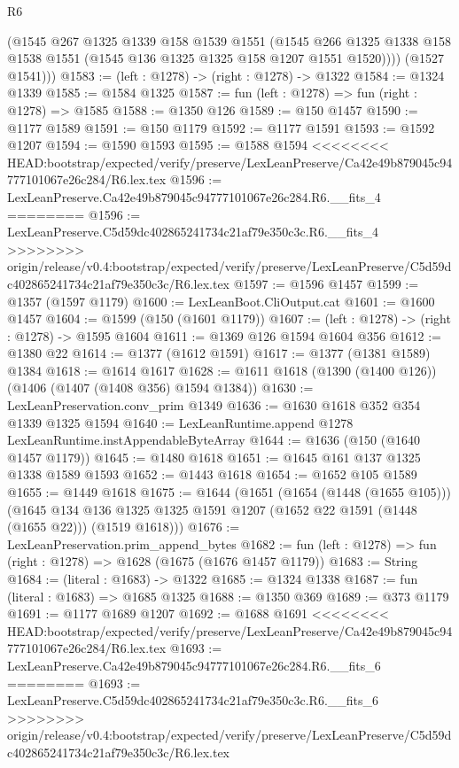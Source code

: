 \begin{lexlean}{R6}
\begin{coremodule}
{{{{{{{{{{{{{{{{{{{{{{{{{{{{{{{{{{{{{{{{{{{{{{{{{{          (@1545
            @267
            @1325
            @1339
            @158
            @1539
            @1551
            (@1545
              @266
              @1325
              @1338
              @158
              @1538
              @1551
              (@1545 @136 @1325 @1325 @158 @1207 @1551 @1520))))
        (@1527 @1541)))
@1583 := (left : @1278) -> (right : @1278) -> @1322
@1584 := @1324 @1339
@1585 := @1584 @1325
@1587 := fun (left : @1278) => fun (right : @1278) => @1585
@1588 := @1350 @126
@1589 := @150 @1457
@1590 := @1177 @1589
@1591 := @150 @1179
@1592 := @1177 @1591
@1593 := @1592 @1207
@1594 := @1590 @1593
@1595 := @1588 @1594
<<<<<<<< HEAD:bootstrap/expected/verify/preserve/LexLeanPreserve/Ca42e49b879045c94777101067e26c284/R6.lex.tex
@1596 := LexLeanPreserve.Ca42e49b879045c94777101067e26c284.R6.__fits_4
========
@1596 := LexLeanPreserve.C5d59dc402865241734c21af79e350c3c.R6.__fits_4
>>>>>>>> origin/release/v0.4:bootstrap/expected/verify/preserve/LexLeanPreserve/C5d59dc402865241734c21af79e350c3c/R6.lex.tex
@1597 := @1596 @1457
@1599 := @1357 (@1597 @1179)
@1600 := LexLeanBoot.CliOutput.cat
@1601 := @1600 @1457
@1604 := @1599 (@150 (@1601 @1179))
@1607 := (left : @1278) -> (right : @1278) -> @1595 @1604
@1611 := @1369 @126 @1594 @1604 @356
@1612 := @1380 @22
@1614 := @1377 (@1612 @1591)
@1617 := @1377 (@1381 @1589) @1384
@1618 := @1614 @1617
@1628 := @1611 @1618 (@1390 (@1400 @126)) (@1406 (@1407 (@1408 @356) @1594 @1384))
@1630 := LexLeanPreservation.conv_prim @1349
@1636 := @1630 @1618 @352 @354 @1339 @1325 @1594
@1640 := LexLeanRuntime.append @1278 LexLeanRuntime.instAppendableByteArray
@1644 := @1636 (@150 (@1640 @1457 @1179))
@1645 := @1480 @1618
@1651 := @1645 @161 @137 @1325 @1338 @1589 @1593
@1652 := @1443 @1618
@1654 := @1652 @105 @1589
@1655 := @1449 @1618
@1675 := @1644
    (@1651
      (@1654 (@1448 (@1655 @105)))
      (@1645 @134 @136 @1325 @1325 @1591 @1207 (@1652 @22 @1591 (@1448 (@1655 @22))) (@1519 @1618)))
@1676 := LexLeanPreservation.prim_append_bytes
@1682 := fun (left : @1278) => fun (right : @1278) => @1628 (@1675 (@1676 @1457 @1179))
@1683 := String
@1684 := (literal : @1683) -> @1322
@1685 := @1324 @1338
@1687 := fun (literal : @1683) => @1685 @1325
@1688 := @1350 @369
@1689 := @373 @1179
@1691 := @1177 @1689 @1207
@1692 := @1688 @1691
<<<<<<<< HEAD:bootstrap/expected/verify/preserve/LexLeanPreserve/Ca42e49b879045c94777101067e26c284/R6.lex.tex
@1693 := LexLeanPreserve.Ca42e49b879045c94777101067e26c284.R6.__fits_6
========
@1693 := LexLeanPreserve.C5d59dc402865241734c21af79e350c3c.R6.__fits_6
>>>>>>>> origin/release/v0.4:bootstrap/expected/verify/preserve/LexLeanPreserve/C5d59dc402865241734c21af79e350c3c/R6.lex.tex
}}}}}}}}}}}}}}}}}}}}}}}}}}}}}}}}}}}}}}}}}}}}}}}}}}
\end{coremodule}
\end{lexlean}
